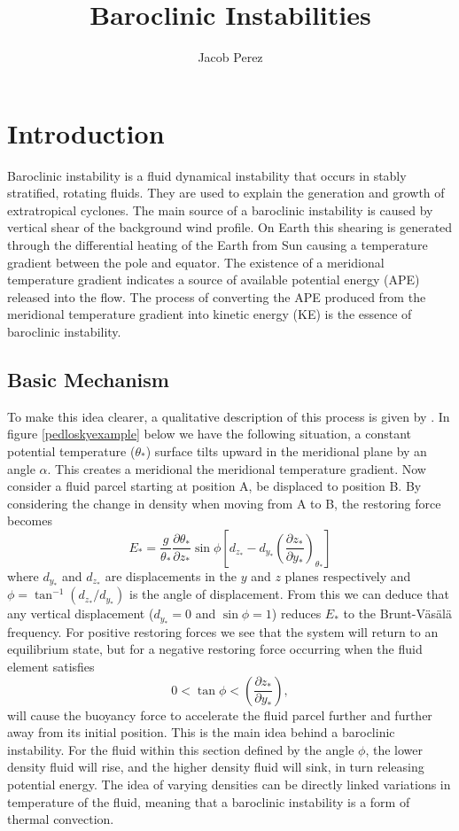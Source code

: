 \documentclass{article}
\title{Baroclinic Instabilities}
\author{Jacob Perez}
\begin{document}
 
\maketitle
\tableofcontents 
\section{Introduction} 

Baroclinic instability is a fluid dynamical instability that occurs in stably stratified, rotating fluids. They are used to explain the generation and growth of extratropical cyclones. The main source of a baroclinic instability is caused by vertical shear of the background wind profile. On Earth this shearing is generated through the differential heating of the Earth from Sun causing a temperature gradient between the pole and equator. The existence of a meridional temperature gradient indicates a source of available potential energy (APE) released into the flow. The process of converting the APE produced from the meridional temperature gradient into kinetic energy (KE) is the essence of baroclinic instability.  

\subsection{Basic Mechanism} 

To make this idea clearer, a qualitative description of this process is given by \cite{Pedlosky1979}. In figure \ref{pedloskyexample} below we have the following situation, a constant potential temperature ($\theta_*$) surface tilts upward in the meridional plane by an angle $\alpha$. This creates a meridional the meridional temperature gradient. Now consider a fluid parcel starting at position A, be displaced to position B. By considering the change in density when moving from A to B, the restoring force becomes  
\begin{equation}
  E_* = \frac{g}{\theta_*}\frac{\partial\theta_*}{\partial z_*}\sin\phi\left[d_{z_*}-d_{y_*}\left(\frac{\partial z_*}{\partial y_*}\right)_{\theta_*}\right]
\end{equation}
where $d_{y_*}$ and $d_{z_*}$ are displacements in the $y$ and $z$ planes respectively and $\phi=\tan^{-1}(d_{z_*}/d_{y_*})$ is the angle of displacement. From this we can deduce that any vertical displacement ($d_{y_*}=0$ and $\sin\phi = 1$) reduces $E_*$ to the Brunt-V\"as\"al\"a frequency. For positive restoring forces we see that the system will return to an equilibrium state, but for a negative restoring force occurring when the fluid element satisfies
\begin{equation}
  0 < \tan\phi < \left(\frac{\partial z_*}{\partial y_*}\right),
\end{equation}
will cause the buoyancy force to accelerate the fluid parcel further and further away from its initial position. This is the main idea behind a baroclinic instability. For the fluid within this section defined by the angle $\phi$, the lower density fluid will rise, and the higher density fluid will sink, in turn releasing potential energy. The idea of varying densities can be directly linked variations in temperature of the fluid, meaning that a baroclinic instability is a form of thermal convection.
\end{document}
